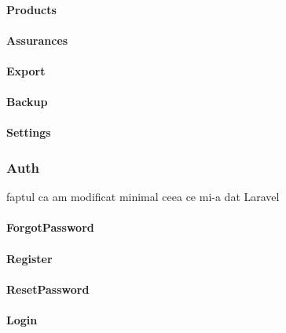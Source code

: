 			\paragraph{Products}
			\paragraph{Assurances}
			\paragraph{Export}
			\paragraph{Backup}
			\paragraph{Settings}
		\subsubsection{Auth}
			faptul ca am modificat minimal ceea ce mi-a dat Laravel
			\paragraph{ForgotPassword}
			\paragraph{Register}
			\paragraph{ResetPassword}
			\paragraph{Login}
